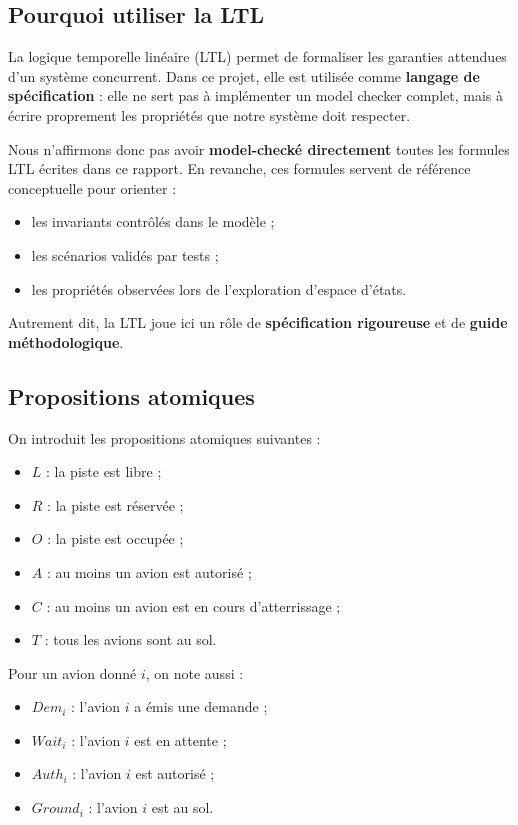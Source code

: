 \documentclass[11pt,a4paper]{article}
\begin{document}
\subsection{Pourquoi utiliser la LTL}

La logique temporelle linéaire (LTL) permet de formaliser les garanties attendues d'un système concurrent. Dans ce projet, elle est utilisée comme \textbf{langage de spécification} : elle ne sert pas à implémenter un model checker complet, mais à écrire proprement les propriétés que notre système doit respecter.

Nous n'affirmons donc pas avoir \textbf{model-checké directement} toutes les formules LTL écrites dans ce rapport. En revanche, ces formules servent de référence conceptuelle pour orienter :
\begin{itemize}
    \item les invariants contrôlés dans le modèle ;
    \item les scénarios validés par tests ;
    \item les propriétés observées lors de l'exploration d'espace d'états.
\end{itemize}

Autrement dit, la LTL joue ici un rôle de \textbf{spécification rigoureuse} et de \textbf{guide méthodologique}.

\subsection{Propositions atomiques}

On introduit les propositions atomiques suivantes :
\begin{itemize}
    \item $L$ : la piste est libre ;
    \item $R$ : la piste est réservée ;
    \item $O$ : la piste est occupée ;
    \item $A$ : au moins un avion est autorisé ;
    \item $C$ : au moins un avion est en cours d'atterrissage ;
    \item $T$ : tous les avions sont au sol.
\end{itemize}

Pour un avion donné $i$, on note aussi :
\begin{itemize}
    \item $Dem_i$ : l'avion $i$ a émis une demande ;
    \item $Wait_i$ : l'avion $i$ est en attente ;
    \item $Auth_i$ : l'avion $i$ est autorisé ;
    \item $Ground_i$ : l'avion $i$ est au sol.
\end{itemize}
\end{document}
